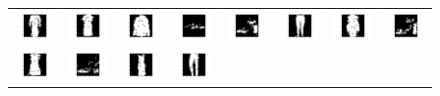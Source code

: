 \documentclass[12pt]{report}
\begin{document}
\begin{figure}[H]
\begin{tabular}{cccccccc}
  \includegraphics[width=0.1\linewidth]{qn2_i_48.png} &   \includegraphics[width=0.1\linewidth]{qn2_i_49.png} &
  \includegraphics[width=0.1\linewidth]{qn2_i_50.png} &   \includegraphics[width=0.1\linewidth]{qn2_i_51.png} &
  \includegraphics[width=0.1\linewidth]{qn2_i_52.png} &   \includegraphics[width=0.1\linewidth]{qn2_i_53.png} &
  \includegraphics[width=0.1\linewidth]{qn2_i_54.png} &   \includegraphics[width=0.1\linewidth]{qn2_i_55.png} \\
  \includegraphics[width=0.1\linewidth]{qn2_i_56.png} &   \includegraphics[width=0.1\linewidth]{qn2_i_57.png} &
  \includegraphics[width=0.1\linewidth]{qn2_i_58.png} &   \includegraphics[width=0.1\linewidth]{qn2_i_59.png} &

\end{tabular}
\end{figure}
\end{document}
